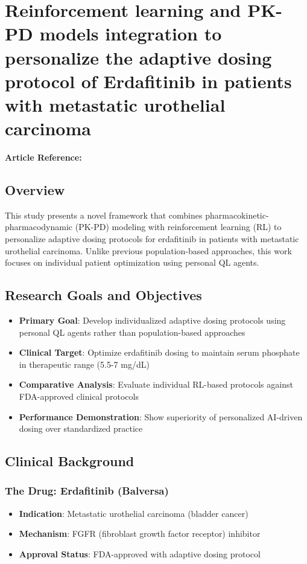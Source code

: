 \section{Reinforcement learning and PK-PD models integration to personalize the adaptive dosing protocol of Erdafitinib in patients with metastatic urothelial carcinoma }
\textbf{Article Reference:} \cite{decarloReinforcementLearningPKPD2024}
\subsection*{Overview}
This study presents a novel framework that combines pharmacokinetic-pharmacodynamic (PK-PD) modeling with reinforcement learning (RL) to personalize adaptive dosing protocols for erdafitinib in patients with metastatic urothelial carcinoma. Unlike previous population-based approaches, this work focuses on individual patient optimization using personal QL agents.


\subsection{Research Goals and Objectives}
\begin{itemize}
    \item \textbf{Primary Goal}: Develop individualized adaptive dosing protocols using personal QL agents rather than population-based approaches
    \item \textbf{Clinical Target}: Optimize erdafitinib dosing to maintain serum phosphate in therapeutic range (5.5-7 mg/dL)
    \item \textbf{Comparative Analysis}: Evaluate individual RL-based protocols against FDA-approved clinical protocols
    \item \textbf{Performance Demonstration}: Show superiority of personalized AI-driven dosing over standardized practice
\end{itemize}

\subsection{Clinical Background}
\subsubsection{The Drug: Erdafitinib (Balversa)}
\begin{itemize}
    \item \textbf{Indication}: Metastatic urothelial carcinoma (bladder cancer)
    \item \textbf{Mechanism}: FGFR (fibroblast growth factor receptor) inhibitor
    \item \textbf{Approval Status}: FDA-approved with adaptive dosing protocol
\end{itemize}

